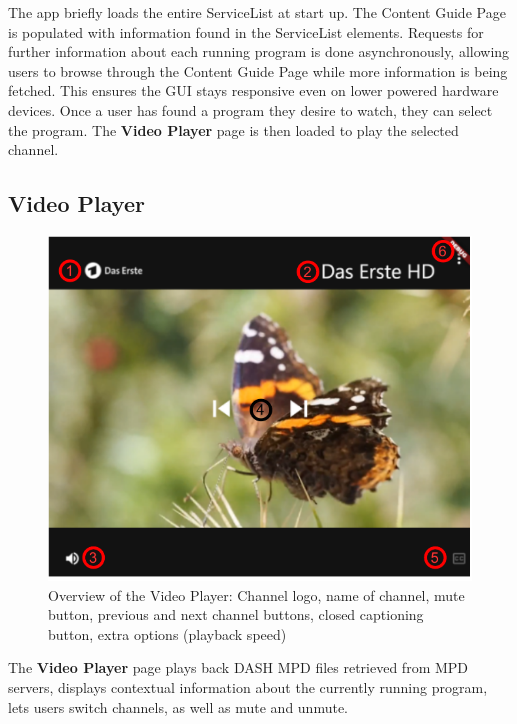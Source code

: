 \documentclass[conference]{IEEEtran}
\begin{document}
The app briefly loads the entire ServiceList at start up. The Content Guide Page is populated with information found in the ServiceList elements. Requests for further information about each running program is done asynchronously, allowing users to browse through the Content Guide Page while more information is being fetched. This ensures the GUI stays responsive even on lower powered hardware devices. Once a user has found a program they desire to watch, they can select the program. The \textbf{Video Player} page is then loaded to play the selected channel.

\subsection{Video Player}
\begin{figure}[h]
	\centerline{\includegraphics[width=\linewidth]{figures/VideoPlayer}}
	\caption{Overview of the Video Player:  Channel logo,  name of channel,  mute button,  previous and next channel buttons,  closed captioning button,  extra options (playback speed) }
	\label{fig:videoPlayer}
\end{figure}
The \textbf{Video Player} page plays back DASH MPD files retrieved from MPD servers, displays contextual information about the currently running program, lets users switch channels, as well as mute and unmute. \\\par
\end{document}
